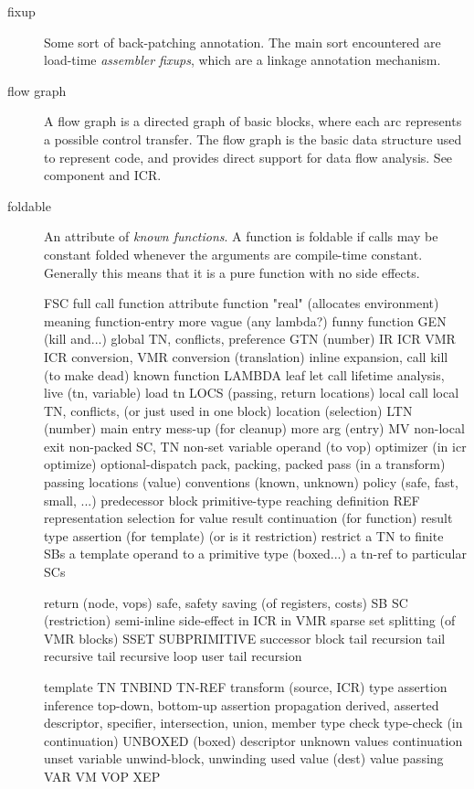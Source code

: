 \begin{description}
\item[fixup]  Some sort of back-patching annotation.  The main sort encountered
are load-time {\it assembler fixups}, which are a linkage annotation mechanism.

\item[flow graph] A flow graph is a directed graph of basic blocks, where each
arc represents a possible control transfer.  The flow graph is the basic data
structure used to represent code, and provides direct support for data flow
analysis.  See component and ICR.

\item[foldable] An attribute of {\it known functions}.  A function is foldable
if calls may be constant folded whenever the arguments are compile-time
constant.  Generally this means that it is a pure function with no side
effects.


FSC
full call
function attribute
function
	"real" (allocates environment)
	meaning function-entry
	more vague (any lambda?)
funny function
GEN (kill and...)
global TN, conflicts, preference
GTN (number)
IR ICR VMR  ICR conversion, VMR conversion (translation)
inline expansion, call
kill (to make dead)
known function
LAMBDA
leaf
let call
lifetime analysis, live (tn, variable)
load tn
LOCS (passing, return locations)
local call
local TN, conflicts, (or just used in one block)
location (selection)
LTN (number)
main entry
mess-up (for cleanup)
more arg (entry)
MV
non-local exit
non-packed SC, TN
non-set variable
operand (to vop)
optimizer (in icr optimize)
optional-dispatch
pack, packing, packed
pass (in a transform)
passing 
	locations (value)
	conventions (known, unknown)
policy (safe, fast, small, ...)
predecessor block
primitive-type
reaching definition
REF
representation
	selection
	for value
result continuation (for function)
result type assertion (for template) (or is it restriction)
restrict
	a TN to finite SBs
	a template operand to a primitive type (boxed...)
	a tn-ref to particular SCs

return (node, vops)
safe, safety
saving (of registers, costs)
SB
SC (restriction)
semi-inline
side-effect
	in ICR
	in VMR
sparse set
splitting (of VMR blocks)
SSET
SUBPRIMITIVE
successor block
tail recursion
	tail recursive
	tail recursive loop
	user tail recursion

template
TN
TNBIND
TN-REF
transform (source, ICR)
type
	assertion
	inference
		top-down, bottom-up
	assertion propagation
        derived, asserted
	descriptor, specifier, intersection, union, member type
        check
type-check (in continuation)
UNBOXED (boxed) descriptor
unknown values continuation
unset variable
unwind-block, unwinding
used value (dest)
value passing
VAR
VM
VOP
XEP

\end{description}
